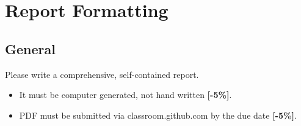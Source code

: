 \documentclass{article}
\begin{document}
\section{Report Formatting}
\subsection{General}
Please write a comprehensive, self-contained report.
                \begin{itemize}
                        \item It must be computer generated, not hand written 
                                {\color{red}\textbf{[-5\%]}}.
                        \item PDF must be submitted via classroom.github.com by 
                                the due date  {\color{red}\textbf{[-5\%]}}.
                \end{itemize}
\end{document}
